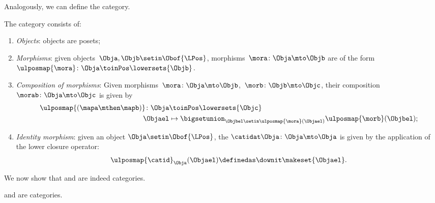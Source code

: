 Analogously, we can define the \LPos category.
\begin{definition}
    \label{def:lpos_cat}
    The category \LPos consists of:
    \begin{enumerate}
        \item \emph{Objects}: objects are posets;
        \item \emph{Morphisms}: given objects~$\Obja,\Objb\setin \Obof{\LPos}$, morphisms~$\mora\colon \Obja\mto \Objb$ are  of the form~$\ulposmap{\mora} \colon \Obja \toinPos \lowersets{\Objb}$.
        \item \emph{Composition of morphisms}: Given morphisms~$\mora \colon \Obja \mto \Objb$,~$\morb \colon \Objb\mto \Objc$, their composition~$\morab\colon \Obja\mto \Objc$ is given by
              \begin{equation}
                  \begin{aligned}
                      \ulposmap{(\mapa \mthen \mapb)} \colon \Obja & \toinPos \lowersets{\Objc} \\
                      \Objael                                      & \mapsto \bigsetunion_{\Objbel\setin \ulposmap{\mora} (\Objael)}\ulposmap{\morb}(\Objbel);
                  \end{aligned}
              \end{equation}
        \item \emph{Identity morphism}: given an object $\Obja\setin \Obof{\LPos}$, the  $\catidat\Obja \colon \Obja \mto \Obja$ is given by the application of the lower closure operator:
              \begin{equation}
                  \ulposmap{\catid}_\Obja(\Objael)\definedas \downit\makeset{\Objael}.
              \end{equation}
    \end{enumerate}
\end{definition}

We now show that \UPos and \LPos are indeed categories.

\begin{lemma}
    \label{lem:upos_lpos_cats}
    \UPos and \LPos are categories.
\end{lemma}

